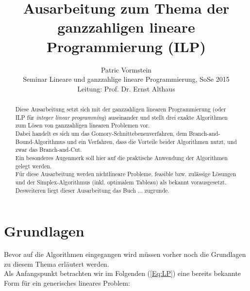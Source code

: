 \documentclass[tog]{acmsiggraph}
\title{Ausarbeitung zum Thema der ganzzahligen lineare Programmierung (ILP)}
\author{Patric Vormstein\\Seminar Lineare und ganzzahlige lineare Programmierung, SoSe 2015\\Leitung: Prof. Dr. Ernst Althaus}
\begin{document}


\maketitle

\begin{abstract}

Diese Ausarbeitung setzt sich mit der ganzzahligen linearen Programmierung (oder ILP für \textit{integer linear programming}) auseinander und stellt drei exakte Algorithmen zum Lösen von ganzzahligen linearen Problemen vor.\\
Dabei handelt es sich um das Gomory-Schnittebenenverfahren, dem Branch-and-Bound-Algorithmus und ein Verfahren, dass die Vorteile beider Algorithmen nutzt, und zwar das Branch-and-Cut.\\
Ein besonderes Augenmerk soll hier auf die praktische Anwendung der Algorithmen gelegt werden.\\
Für diese Ausarbeitung werden nichtlineare Probleme, feasible bzw. zulässige Lösungen und der Simplex-Algorithmus (inkl. optimalem Tableau) als bekannt vorausgesetzt.\\
Desweiteren liegt dieser Ausarbeitung das Buch ... zugrunde.
\end{abstract}



\section{Grundlagen}

Bevor auf die Algorithmen eingegangen wird müssen vorher noch die Grundlagen zu diesem Thema erläutert werden.\\
Als Anfangspunkt betrachten wir im Folgenden (\ref{Eq:LP}) eine bereits bekannte Form für ein generisches lineares Problem:
\end{document}
